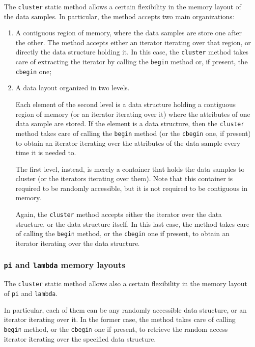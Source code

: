 \documentclass{article}
\begin{document}
The \texttt{cluster} static method allows a certain flexibility in the memory layout of the data
samples. In particular, the method accepts two main organizations:
\begin{enumerate}
    \item A contiguous region of memory, where the data samples are store one after the other.
    The method accepts either an iterator iterating over that region, or directly the data
    structure holding it. In this case, the \texttt{cluster} method takes care of extracting the
    iterator by calling the \texttt{begin} method or, if present, the \texttt{cbegin} one;
    
    \item A data layout organized in two levels.
    
    Each element of the second level is a data structure holding a contiguous region of memory
    (or an iterator iterating over it) where the attributes of one data sample are stored.
    If the element is a data structure, then the \texttt{cluster} method takes care of calling the
    \texttt{begin} method (or the \texttt{cbegin} one, if present) to obtain an iterator
    iterating over the attributes of the data sample every time it is needed to.
    
    The first level, instead, is merely a container that holds the data samples to
    cluster (or the iterators iterating over them).
    Note that this container is required to be randomly accessible, but it is not required to be
    contiguous in memory.
    
    Again, the \texttt{cluster} method accepts either the iterator over the data structure, or
    the data structure itself. In this last case, the method takes care of calling the
    \texttt{begin} method, or the \texttt{cbegin} one if present, to obtain an iterator iterating
    over the data structure.

\end{enumerate}

\hypertarget{par-pi-lambda-layout}{
    \subsubsection{\texttt{pi} and \texttt{lambda} memory layouts}
    \label{par-pi-lambda-layout}}

The \texttt{cluster} static method allows also a certain flexibility in the memory layout of
\texttt{pi} and \texttt{lambda}.

In particular, each of them can be any randomly accessible data structure, or an iterator
iterating over it.
In the former case, the method takes care of calling \texttt{begin} method, or the
\texttt{cbegin} one if present, to retrieve the random access iterator iterating over the
specified data structure.
\end{document}
